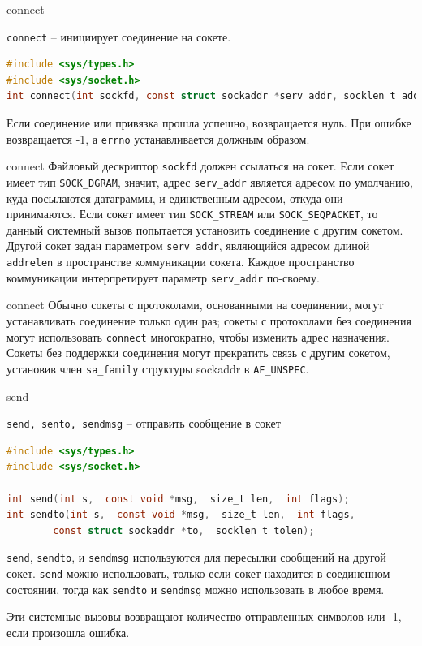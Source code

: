 \begin{frame}[fragile]{connect}

{\tt connect} -- инициирует соединение на сокете.

\scriptsize\begin{lstlisting}[language=C]
#include <sys/types.h> 
#include <sys/socket.h> 
int connect(int sockfd, const struct sockaddr *serv_addr, socklen_t addrlen); 
\end{lstlisting}

Если соединение или привязка прошла успешно, возвращается нуль. 
При ошибке возвращается -1, а {\tt errno} устанавливается должным образом.
\end{frame}

\begin{frame}{connect}
Файловый дескриптор {\tt sockfd} должен ссылаться на сокет. 
Если сокет имеет тип {\tt SOCK\_DGRAM}, значит, адрес {\tt serv\_addr} является 
адресом по умолчанию, куда посылаются датаграммы, и единственным адресом, откуда 
они принимаются. Если сокет имеет тип {\tt SOCK\_STREAM} или {\tt SOCK\_SEQPACKET},
то данный системный вызов попытается установить соединение с другим сокетом.
Другой сокет задан параметром {\tt serv\_addr}, являющийся адресом длиной 
{\tt addrelen} в пространстве коммуникации сокета. Каждое пространство коммуникации 
интерпретирует параметр {\tt serv\_addr} по-своему.
\end{frame}

\begin{frame}{connect}
Обычно сокеты с протоколами, основанными на соединении, могут устанавливать 
соединение только один раз; сокеты с протоколами без соединения могут 
использовать {\tt connect} многократно, чтобы изменить адрес назначения. 
Сокеты без поддержки соединения могут прекратить связь с другим сокетом, 
установив член {\tt sa\_family} структуры sockaddr в {\tt AF\_UNSPEC}.
\end{frame}


\begin{frame}[fragile]{send}

{\tt send, sento, sendmsg} -- отправить сообщение в сокет 
\scriptsize\begin{lstlisting}[language=C]
#include <sys/types.h>
#include <sys/socket.h>

int send(int s,  const void *msg,  size_t len,  int flags);
int sendto(int s,  const void *msg,  size_t len,  int flags,
		const struct sockaddr *to,  socklen_t tolen);
\end{lstlisting}
{\tt send}, {\tt sendto},  и {\tt sendmsg} используются для пересылки сообщений  на  другой  сокет. {\tt send}  можно использовать,   только если сокет находится в соединенном состоянии,  тогда как {\tt sendto} и {\tt sendmsg} можно использовать в любое время.

Эти системные вызовы возвращают  количество  отправленных  символов  или  -1, если  произошла ошибка.
\end{frame}

